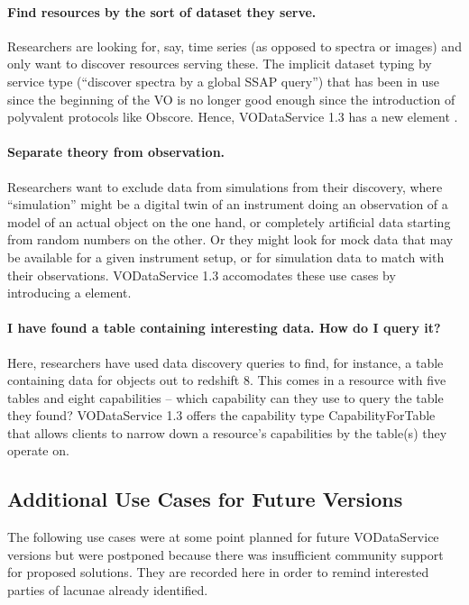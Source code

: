 \documentclass[11pt,a4paper]{ivoa}
\begin{document}
\paragraph{Find resources by the sort of dataset they serve.}
Researchers are looking for, say, time series (as opposed to spectra or
images) and only want to discover resources serving these.  The implicit
dataset typing by service type (``discover spectra by a global SSAP
query'') that has been in use since the beginning of the VO is no longer
good enough since the introduction of polyvalent protocols like Obscore.
Hence, VODataService 1.3 has a new element .

\paragraph{Separate theory from observation.}  Researchers want to
exclude data from simulations from their discovery, where ``simulation''
might be a digital twin of an instrument doing an observation of a model
of an actual object on the one hand, or completely artificial data
starting from random numbers on the other.  Or they might look for mock
data that may be available for a given instrument setup, or for
simulation data to match with their observations.  VODataService 1.3
accomodates these use cases by introducing a  element.

\paragraph{I have found a table containing interesting data.  How do I
query it?} Here, researchers have used data discovery queries to find,
for instance, a table containing data for objects out to redshift 8.
This comes in a resource with five tables and eight capabilities – which
capability can they use to query the table they found?  VODataService
1.3 offers the capability type CapabilityForTable that allows clients
to narrow down a resource's capabilities by the table(s) they operate on.

\subsection{Additional Use Cases for Future Versions}

The following use cases were at some point planned for future VODataService
versions but were postponed because there was insufficient community
support for proposed solutions.  They are recorded here in order to
remind interested parties of lacunae already identified.
\end{document}
